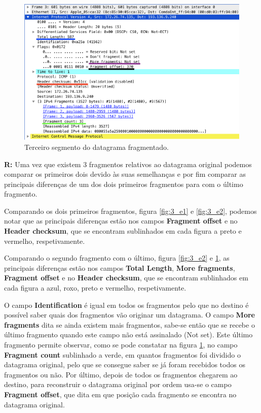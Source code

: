\documentclass{llncs}
\begin{document}
\begin{figure}[H]
\begin{center}
\includegraphics[scale=0.40]{3_e3.png} 
\end{center}
\caption{\label{fig:3_e3}Terceiro segmento do datagrama fragmentado.}
\end{figure}


\textbf{R:} Uma vez que existem 3 fragmentos relativos ao datagrama original podemos comparar os primeiros dois devido às suas semelhanças e por fim comparar as principais diferenças de um dos dois primeiros fragmentos para com o último fragmento.

Comparando os dois primeiros fragmentos, figura \ref{fig:3_e1} e \ref{fig:3_e2}, podemos notar que as principais diferenças estão nos campos \textbf{Fragment offset} e no \textbf{Header checksum}, que se encontram sublinhados em cada figura a preto e vermelho, respetivamente.

Comparando o segundo fragmento com o último, figura \ref{fig:3_e2} e \ref{fig:3_e3}, as principais diferenças estão nos campos \textbf{Total Length}, \textbf{More fragments}, \textbf{Fragment offset} e no \textbf{Header checksum}, que se encontram sublinhados em cada figura a azul, roxo, preto e vermelho, respetivamente.

O campo \textbf{Identification} é igual em todos os fragmentos pelo que no destino é possível saber quais dos fragmentos vão originar um datagrama. O campo  \textbf{More fragments} dita se ainda existem mais fragmentos, sabe-se então que se recebe o último fragmento quando este campo não está assinalado (Not set). Este último fragmento permite observar, como se pode constatar na figura \ref{fig:3_e3}, no campo  \textbf{Fragment count} sublinhado a verde, em quantos fragmentos foi dividido o datagrama original, pelo que se consegue saber se já foram recebidos todos os fragmentos ou não. Por último, depois de todos os fragmentos chegarem ao destino, para reconstruir o datagrama original por ordem usa-se o campo  \textbf{Fragment offset}, que dita em que posição cada fragmento se encontra no datagrama original.
\end{document}
